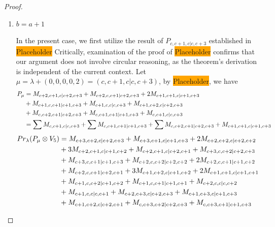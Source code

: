 \begin{proof}
\begin{enumerate}
\begin{enumerate}
      \item $ b=a+1 $\par
        In the present case, we first utilize the result of $P_{c,c+1,c|c,c+3}$ established in \colorbox{orange}{Placeholder} Critically, examination of the proof of \colorbox{orange}{Placeholder} confirms that our argument does not involve circular reasoning, as the theorem's derivation is independent of the current context. Let $\mu = \lambda + (0,0,0,0,2) =(c,c+1,c|c,c+3) $, by \colorbox{orange}{Placeholder}, we have
        \begin{equation}\notag
          \begin{aligned}
            P_\mu &= 
M_{c+2,c+1,c|c+2,c+3}
+M_{c+2,c,c+1|c+2,c+3}
+2M_{c+1,c+1,c|c+1,c+3}\\
                                              &
+M_{c+1,c,c+1|c+1,c+3}
+M_{c+1,c,c|c,c+3}
+M_{c+1,c+2,c|c+2,c+3}\\
                                              &
+M_{c,c+2,c+1|c+2,c+3}
+M_{c,c+1,c+1|c+1,c+3}
+M_{c,c+1,c|c,c+3} \\
                  &=
\sum M_{c,c+1,c|c,c+3}
+\sum M_{c,c+1,c+1|c+1,c+3}
+\sum M_{c,c+2,c+1|c+2,c+3}
+ M_{c+1,c+1,c|c+1,c+3}
          \end{aligned}
        \end{equation}
        \begin{equation}\notag
          \begin{aligned}
            Pr_{\lambda}(P_\mu \otimes V_{5}) &=
M_{c+3,c+2,c|c+2,c+3}
+ M_{c+3,c+1,c|c+1,c+3}
+ 2M_{c+2,c+2,c|c+2,c+2}\\
                                              &
+ 3M_{c+2,c+1,c|c+1,c+2}
+ M_{c+2,c+1,c|c+2,c+1}
+ M_{c+3,c,c+2|c+2,c+3}\\
                                              &
+ M_{c+3,c,c+1|c+1,c+3}
+ M_{c+2,c,c+2|c+2,c+2}
+ 2M_{c+2,c,c+1|c+1,c+2}\\
                                              &
+ M_{c+2,c,c+1|c+2,c+1}
+ 3M_{c+1,c+2,c|c+1,c+2}
+ 2M_{c+1,c+1,c|c+1,c+1}\\
                                              &
+ M_{c+1,c,c+2|c+1,c+2}
+ M_{c+1,c,c+1|c+1,c+1}
+ M_{c+2,c,c|c,c+2}\\
                                              &
+ M_{c+1,c,c|c,c+1}
+ M_{c+2,c+3,c|c+2,c+3}
+ M_{c+1,c+3,c|c+1,c+3}\\
                                              &
+ M_{c+1,c+2,c|c+2,c+1}
+ M_{c,c+3,c+2|c+2,c+3}
+ M_{c,c+3,c+1|c+1,c+3}\\

\end{aligned}
\end{equation}
\end{enumerate}
\end{enumerate}
\end{proof}
